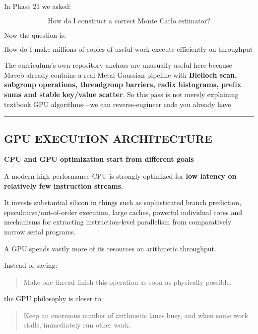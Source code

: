 In Phase 21 we asked:

\[
\boxed{\text{How do I construct a correct Monte Carlo estimator?}}
\]

Now the question is:

\[
\boxed{\text{How do I make millions of copies of useful work execute efficiently on throughput hardware?}}
\]

The curriculum's own repository anchors are unusually useful here because Maveb already contains a real Metal Gaussian pipeline with \textbf{Blelloch scan, subgroup operations, threadgroup barriers, radix histograms, prefix sums and stable key/value scatter}. So this pass is not merely explaining textbook GPU algorithms---we can reverse-engineer code you already have.

\begin{center}\rule{0.5\linewidth}{0.5pt}\end{center}

\subsection{GPU EXECUTION ARCHITECTURE}\label{01-foundations-i-ch008-gpu-execution-architecture}

\hypertarget{01-foundations-i-ch008-gpu-execution-architecture}{}

\textbf{CPU and GPU optimization start from different goals}

A modern high-performance CPU is strongly optimized for \textbf{low latency on relatively few instruction streams}.

It invests substantial silicon in things such as sophisticated branch prediction, speculative/out-of-order execution, large caches, powerful individual cores and mechanisms for extracting instruction-level parallelism from comparatively narrow serial programs.

A GPU spends vastly more of its resources on arithmetic throughput.

Instead of saying:

\begin{quote}
Make one thread finish this operation as soon as physically possible.
\end{quote}

the GPU philosophy is closer to:

\begin{quote}
Keep an enormous number of arithmetic lanes busy, and when some work stalls, immediately run other work.
\end{quote}

